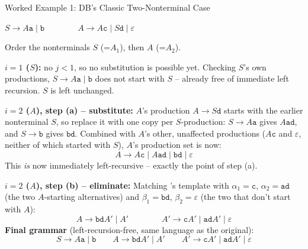 \documentclass[full-course-notes.tex]{subfiles}
\begin{document}
\begin{examplebox}{Worked Example 1: DB's Classic Two-Nonterminal Case}
\begin{center}
\ttfamily
$S \to A\texttt{a} \mid \texttt{b} \qquad\qquad A \to A\texttt{c} \mid S\texttt{d} \mid
\varepsilon$
\end{center}
Order the nonterminals $S$ (=$A_1$), then $A$ (=$A_2$).

\textbf{$i=1$ ($S$):} no $j < 1$, so no substitution is possible yet. Checking $S$'s own
productions, $S \to A\texttt{a} \mid \texttt{b}$ does not start with $S$ -- already free of
immediate left recursion. $S$ is left unchanged.

\textbf{$i=2$ ($A$), step (a) -- substitute:} $A$'s production $A \to S\texttt{d}$ starts with
the earlier nonterminal $S$, so replace it with one copy per $S$-production: $S \to A\texttt{a}$
gives $A\texttt{a}\texttt{d}$, and $S \to \texttt{b}$ gives $\texttt{b}\texttt{d}$. Combined with
$A$'s other, unaffected productions ($A\texttt{c}$ and $\varepsilon$, neither of which started
with $S$), $A$'s production set is now:
\[
A \to A\texttt{c} \mid A\texttt{a}\texttt{d} \mid \texttt{b}\texttt{d} \mid \varepsilon
\]
This \emph{is} now immediately left-recursive -- exactly the point of step (a).

\textbf{$i=2$ ($A$), step (b) -- eliminate:} Matching 's
template with $\alpha_1 = \texttt{c}$, $\alpha_2 = \texttt{a}\texttt{d}$ (the two
$A$-starting alternatives) and $\beta_1 = \texttt{b}\texttt{d}$, $\beta_2 = \varepsilon$ (the
two that don't start with $A$):
\[
A \to \texttt{b}\texttt{d}A' \mid A' \qquad\qquad A' \to \texttt{c}A' \mid
\texttt{a}\texttt{d}A' \mid \varepsilon
\]
\textbf{Final grammar} (left-recursion-free, same language as the original):
\[
S \to A\texttt{a} \mid \texttt{b} \qquad A \to \texttt{b}\texttt{d}A' \mid A' \qquad A' \to
\texttt{c}A' \mid \texttt{a}\texttt{d}A' \mid \varepsilon
\]
\end{examplebox}
\end{document}
